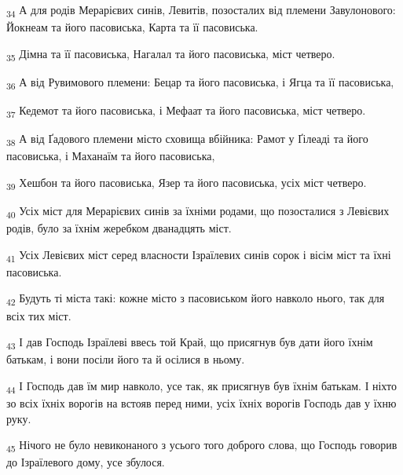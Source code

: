 \begin{tcolorbox}
\textsubscript{34} А для родів Мерарієвих синів, Левитів, позосталих від племени Завулонового: Йокнеам та його пасовиська, Карта та її пасовиська.
\end{tcolorbox}
\begin{tcolorbox}
\textsubscript{35} Дімна та її пасовиська, Нагалал та його пасовиська, міст четверо.
\end{tcolorbox}
\begin{tcolorbox}
\textsubscript{36} А від Рувимового племени: Бецар та його пасовиська, і Ягца та її пасовиська,
\end{tcolorbox}
\begin{tcolorbox}
\textsubscript{37} Кедемот та його пасовиська, і Мефаат та його пасовиська, міст четверо.
\end{tcolorbox}
\begin{tcolorbox}
\textsubscript{38} А від Ґадового племени місто сховища вбійника: Рамот у Ґілеаді та його пасовиська, і Маханаїм та його пасовиська,
\end{tcolorbox}
\begin{tcolorbox}
\textsubscript{39} Хешбон та його пасовиська, Язер та його пасовиська, усіх міст четверо.
\end{tcolorbox}
\begin{tcolorbox}
\textsubscript{40} Усіх міст для Мерарієвих синів за їхніми родами, що позосталися з Левієвих родів, було за їхнім жеребком дванадцять міст.
\end{tcolorbox}
\begin{tcolorbox}
\textsubscript{41} Усіх Левієвих міст серед власности Ізраїлевих синів сорок і вісім міст та їхні пасовиська.
\end{tcolorbox}
\begin{tcolorbox}
\textsubscript{42} Будуть ті міста такі: кожне місто з пасовиськом його навколо нього, так для всіх тих міст.
\end{tcolorbox}
\begin{tcolorbox}
\textsubscript{43} І дав Господь Ізраїлеві ввесь той Край, що присягнув був дати його їхнім батькам, і вони посіли його та й осілися в ньому.
\end{tcolorbox}
\begin{tcolorbox}
\textsubscript{44} І Господь дав їм мир навколо, усе так, як присягнув був їхнім батькам. І ніхто зо всіх їхніх ворогів на встояв перед ними, усіх їхніх ворогів Господь дав у їхню руку.
\end{tcolorbox}
\begin{tcolorbox}
\textsubscript{45} Нічого не було невиконаного з усього того доброго слова, що Господь говорив до Ізраїлевого дому, усе збулося.
\end{tcolorbox}
